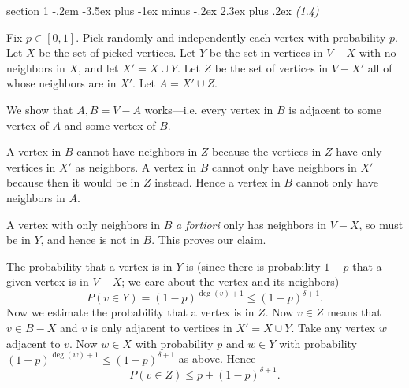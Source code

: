 \documentclass[12pt]{article}
\makeatletter
\theoremstyle{norm}
\newcommand{\E}[0]{\mathbb{E}}
\newcommand{\subeq}[0]{\subseteq}
\newcommand{\de}[0]{\delta}
\newenvironment{problem}{\@startsection
       {section}
       {1}
       {-.2em}
       {-3.5ex plus -1ex minus -.2ex}
       {2.3ex plus .2ex}
       {\pagebreak[3]%
       \large\bf\noindent{Problem }
       }
       }
       {%
       }
\makeatother
\begin{document}
\begin{problem} {\it (1.4)}

Fix $p\in [0,1]$. Pick randomly and independently each vertex with probability $p$. Let $X$ be the set of picked vertices. %
Let $Y$ be the set in vertices in $V-X$ with no neighbors in $X$, and let $X'=X\cup Y$. Let $Z$ be the set of vertices in $V-X'$ all of whose neighbors are in $X'$. Let $A=X'\cup Z$. 

We show that $A, B=V-A$ works---i.e. every vertex in $B$ is adjacent to some vertex of $A$ and some vertex of $B$.

A vertex in $B$ cannot have neighbors in $Z$ because the vertices in $Z$ have only vertices in $X'$ as neighbors. A vertex in $B$ cannot only have neighbors in $X'$ because then it would be in $Z$ instead. Hence  a vertex in $B$ cannot only have neighbors in $A$.

A vertex with only neighbors in $B$ {\it a fortiori} only has neighbors  in $V-X$, so must be in $Y$, and hence is not in $B$. This proves our claim.

The probability that a vertex is in $Y$ is (since there is probability $1-p$ that a given vertex is in $V-X$; we care about the vertex and its neighbors)
\[
P(v\in Y)=(1-p)^{\deg(v)+1}\leq (1-p)^{\de+1}.
\]
Now we estimate the probability that a vertex is in $Z$. Now $v\in Z$ means that $v\in B-X$ and $v$ is only adjacent to vertices in $X'=X\cup Y$. %
Take any vertex $w$ adjacent to $v$. Now $w\in X$ with probability $p$ and $w\in Y$ with probability $(1-p)^{\deg(w)+1}\leq (1-p)^{\de+1}$ as above. Hence
\[
P(v\in Z)\leq p+(1-p)^{\de+1}.
\]


\end{problem}
\end{document}
